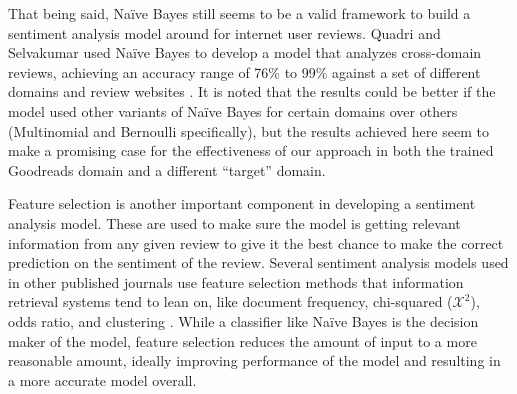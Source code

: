 That being said, Na\"ive Bayes still seems to be a valid framework to build a sentiment analysis model around for
internet user reviews. Quadri and Selvakumar used Na\"ive Bayes to develop a model that analyzes cross-domain
reviews, achieving an accuracy range of 76\% to 99\% against a set of different domains and review websites 
\cite{Quadri2020}. It is noted that the results could be better if the model used other variants of Na\"ive Bayes
for certain domains over others (Multinomial and Bernoulli specifically), but the results achieved here seem to make
a promising case for the effectiveness of our approach in both the trained Goodreads domain and a different
``target'' domain.

Feature selection is another important component in developing a sentiment analysis model. These are used to make
sure the model is getting relevant information from any given review to give it the best chance to make the correct
prediction on the sentiment of the review. Several sentiment analysis models used in other published journals use
feature selection methods that information retrieval systems tend to lean on, like document frequency, chi-squared ($\mathcal{X}^2$),
odds ratio, and clustering \cite{Hung2015}. While a classifier like Na\"ive Bayes is the decision maker of the model, feature selection
reduces the amount of input to a more reasonable amount, ideally improving performance of the model and resulting
in a more accurate model overall.